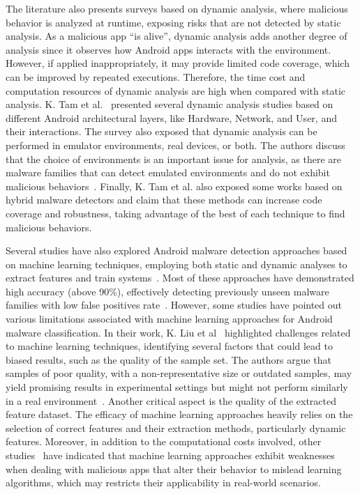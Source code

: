 The literature also presents surveys based on dynamic analysis, where malicious behavior is analyzed at runtime, exposing risks that are not detected by static analysis. As a malicious app ``is alive'', dynamic analysis adds another degree of analysis since it observes how Android apps interacts with the environment. However, if applied inappropriately, it may provide limited code coverage, which can be improved by repeated executions. Therefore, the time cost and computation resources of dynamic analysis are high when compared with static analysis. K. Tam et al.~\cite{DBLP:journals/csur/TamFASC17} presented several dynamic analysis studies based on different Android architectural layers, like Hardware, Network, and User, and their interactions. The survey also exposed that dynamic analysis can be performed in emulator environments, real devices, or both. The authors discuss that the choice of environments is an important issue for analysis, as there are malware families that can detect emulated environments and do not exhibit malicious behaviors~\cite{DBLP:journals/csr/SihagVS21}. Finally, K. Tam et al. also exposed some works based on hybrid malware detectors and claim that these methods can increase code coverage and robustness, taking advantage of the best of each technique to find malicious behaviors.

Several studies have also explored Android malware detection approaches based on machine learning techniques, employing both static and dynamic analyses to extract features and train systems~\cite{DBLP:journals/access/LiuXXZSL20}. Most of these approaches have demonstrated high accuracy (above 90\%), effectively detecting previously unseen malware families with low false positives rate~\cite{DBLP:journals/corr/abs-2001-09406}. However, some studies have pointed out various limitations associated with machine learning approaches for Android malware classification. In their work, K. Liu et al~\cite{DBLP:journals/access/LiuXXZSL20} highlighted challenges related to machine learning techniques, identifying several factors that could lead to biased results, such as the quality of the sample set. The authors argue that samples of poor quality, with a non-representative size or outdated samples, may yield promising results in experimental settings but might not perform similarly in a real environment~\cite{DBLP:journals/access/LiuXXZSL20}. Another critical aspect is the quality of the extracted feature dataset. The efficacy of machine learning approaches heavily relies on the selection of correct features and their extraction methods, particularly dynamic features. Moreover, in addition to the computational costs involved, other studies~\cite{DBLP:journals/tdsc/DemontisMBMARCG19,DBLP:journals/csur/GardinerN16} have indicated that machine learning approaches exhibit weaknesses when dealing with malicious apps that alter their behavior to mislead learning algorithms, which may restricts their applicability in real-world scenarios.
